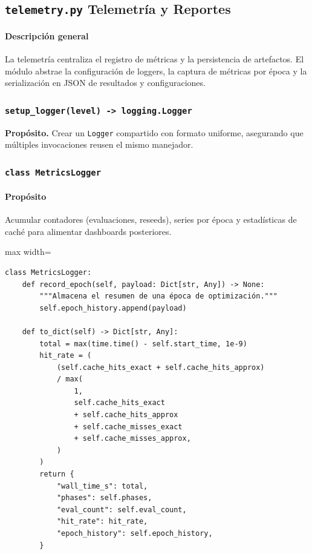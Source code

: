 \subsection{\texttt{telemetry.py} \- Telemetría y Reportes}
\paragraph{Descripción general}
La telemetría centraliza el registro de métricas y la persistencia de artefactos. El módulo abstrae la configuración de loggers, la captura de métricas por época y la serialización en JSON de resultados y configuraciones.

\subsubsection{\texttt{setup\_logger(level) -> logging.Logger}}
\textbf{Propósito.} Crear un \texttt{Logger} compartido con formato uniforme, asegurando que múltiples invocaciones reusen el mismo manejador.

\subsubsection{\texttt{class MetricsLogger}}
\paragraph{Propósito} Acumular contadores (evaluaciones, reseeds), series por época y estadísticas de caché para alimentar dashboards posteriores.

\begin{listing}[H]
\caption{Registro de métricas por época}
\begin{adjustbox}{max width=\textwidth}
\begin{minipage}{\textwidth}
\begin{verbatim}
class MetricsLogger:
    def record_epoch(self, payload: Dict[str, Any]) -> None:
        """Almacena el resumen de una época de optimización."""
        self.epoch_history.append(payload)

    def to_dict(self) -> Dict[str, Any]:
        total = max(time.time() - self.start_time, 1e-9)
        hit_rate = (
            (self.cache_hits_exact + self.cache_hits_approx)
            / max(
                1,
                self.cache_hits_exact
                + self.cache_hits_approx
                + self.cache_misses_exact
                + self.cache_misses_approx,
            )
        )
        return {
            "wall_time_s": total,
            "phases": self.phases,
            "eval_count": self.eval_count,
            "hit_rate": hit_rate,
            "epoch_history": self.epoch_history,
        }
\end{verbatim}
\end{minipage}
\end{adjustbox}
\end{listing}


